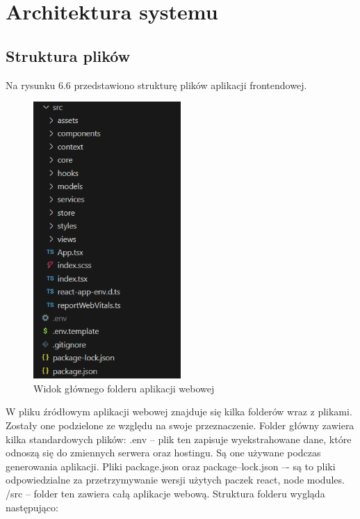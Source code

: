 \documentclass[a4paper,twoside,12pt]{book}
\begin{document}
\section{Architektura systemu}

\subsection{Struktura plików}
Na rysunku 6.6 przedstawiono strukturę plików aplikacji frontendowej.
\begin{figure}[H]
    \centering
    \includegraphics[width=0.5\textwidth]{webowka_ss/folder_glowny.png}
    \caption{Widok głównego folderu aplikacji webowej}
\end{figure}
W pliku źródłowym aplikacji webowej znajduje się kilka folderów wraz z plikami. Zostały one podzielone ze względu na swoje przeznaczenie. Folder główny zawiera kilka standardowych plików:
.env – plik ten zapisuje wyekstrahowane dane, które odnoszą się do zmiennych serwera oraz hostingu. Są one używane podczas generowania aplikacji.
Pliki package.json oraz package--lock.json –- są to pliki odpowiedzialne za przetrzymywanie wersji użytych paczek react, node modules.
/src – folder ten zawiera całą aplikacje webową. Struktura folderu wygląda następująco:
\end{document}
